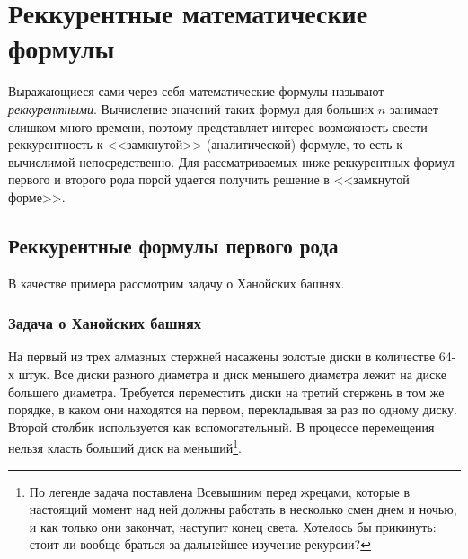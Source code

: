 \begin{frame}
    \begin{algorithm}[H]
        \caption{$value(ct)$}
        \begin{algorithmic}[1]
            
            \ELSE
            \ENDIF
        \end{algorithmic}
    \end{algorithm}
\end{frame}


\section{Реккурентные математические формулы}

Выражающиеся сами через себя математические формулы называют \emph{реккурентными}. Вычисление значений таких формул для больших $n$ занимает слишком много времени, поэтому представляет интерес возможность свести реккурентность к <<замкнутой>> (аналитической) формуле, то есть к вычислимой непосредственно. Для рассматриваемых ниже реккурентных формул первого и второго рода порой удается получить решение в <<замкнутой форме>>.


\subsection{Реккурентные формулы первого рода}

В качестве примера рассмотрим задачу о Ханойских башнях.
\begin{frame}
    \frametitle{Задача о Ханойских башнях}

    \begin{example}
        На первый из трех алмазных стержней насажены золотые диски в количестве 64-х штук. Все диски разного диаметра и диск меньшего диаметра лежит на диске большего диаметра. Требуется переместить диски на третий стержень в том же порядке, в каком они находятся на первом, перекладывая за раз по одному диску. Второй столбик используется как вспомогательный. В процессе перемещения нельзя класть больший диск на меньший\footnote{По легенде задача поставлена Всевышним перед жрецами, которые в настоящий момент над ней должны работать в несколько смен днем и ночью, и как только они закончат, наступит конец света. Хотелось бы прикинуть: стоит ли вообще браться за дальнейшее изучение рекурсии?}.
    \end{example}
\end{frame}

